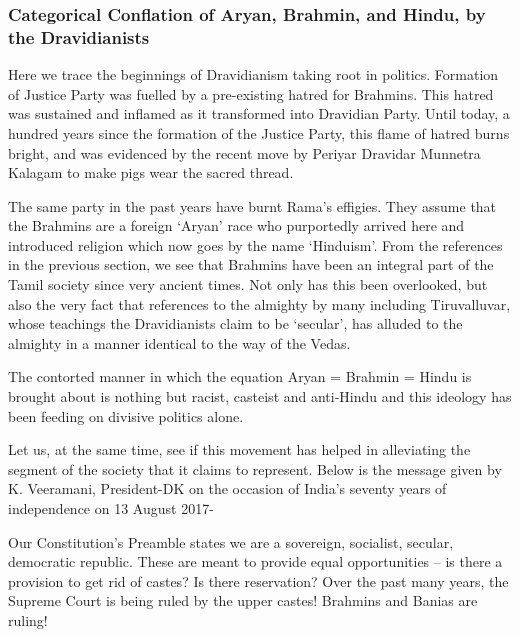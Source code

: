 \subsubsection{Categorical Conflation of Aryan, Brahmin, and Hindu, by the Dravidianists}

Here we trace the beginnings of Dravidianism taking root in politics. Formation of Justice Party was fuelled by a pre-existing hatred for Brahmins. This hatred was sustained and inflamed as it transformed into Dravidian Party. Until today, a hundred years since the formation of the Justice Party, this flame of hatred burns bright, and was evidenced by the recent move by Periyar Dravidar Munnetra Kalagam to make pigs wear the sacred thread.

The same party in the past years have burnt Rama’s effigies. They assume that the Brahmins are a foreign ‘Aryan’ race who purportedly arrived here and introduced religion which now goes by the name ‘Hinduism’. From the references in the previous section, we see that Brahmins have been an integral part of the Tamil society since very ancient times. Not only has this been overlooked, but also the very fact that references to the almighty by many including Tiruvalluvar, whose teachings the Dravidianists claim to be ‘secular’, has alluded to the almighty in a manner identical to the way of the Vedas. 

The contorted manner in which the equation Aryan = Brahmin = Hindu is brought about is nothing but racist, casteist and anti-Hindu and this ideology has been feeding on divisive politics alone.

Let us, at the same time, see if this movement has helped in alleviating the segment of the society that it claims to represent. Below is the message given by K. Veeramani, President-DK on the occasion of India’s seventy years of independence on 13 August 2017-

\begin{myquote}
Our Constitution’s Preamble states we are a sovereign, socialist, secular, democratic republic. These are meant to provide equal opportunities – is there a provision to get rid of castes? Is there reservation? Over the past many years, the Supreme Court is being ruled by the upper castes! Brahmins and Banias are ruling!
\end{myquote}

